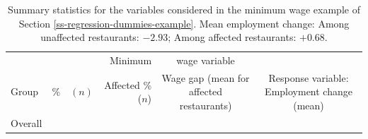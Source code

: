\documentclass[11pt,a4paper,openany]{book}
\begin{document}
\begin{longtable}[]{@{}lrrrcc@{}}
\caption{\label{tab:t-fastfood-descr} Summary statistics for the variables
considered in the minimum wage example of Section
\ref{ss-regression-dummies-example}. Mean employment change: Among
unaffected restaurants: \(-2.93\); Among affected restaurants:
\(+0.68\).}\tabularnewline
\toprule
\begin{minipage}[t]{0.26\columnwidth}\raggedright\strut
\strut
\end{minipage} & \begin{minipage}[t]{0.04\columnwidth}\raggedleft\strut
\strut
\end{minipage} & \begin{minipage}[t]{0.05\columnwidth}\raggedleft\strut
\strut
\end{minipage} & \begin{minipage}[t]{0.29\columnwidth}\raggedleft\strut
Minimum\strut
\end{minipage} & \begin{minipage}[t]{0.10\columnwidth}\centering\strut
wage variable\strut
\end{minipage} & \begin{minipage}[t]{0.08\columnwidth}\centering\strut
\strut
\end{minipage}\tabularnewline
\begin{minipage}[t]{0.26\columnwidth}\raggedright\strut
Group\strut
\end{minipage} & \begin{minipage}[t]{0.04\columnwidth}\raggedleft\strut
\%\strut
\end{minipage} & \begin{minipage}[t]{0.05\columnwidth}\raggedleft\strut
\((n)\)\strut
\end{minipage} & \begin{minipage}[t]{0.29\columnwidth}\raggedleft\strut
Affected \% (\(n\))\strut
\end{minipage} & \begin{minipage}[t]{0.10\columnwidth}\centering\strut
Wage gap (mean for affected restaurants)\strut
\end{minipage} & \begin{minipage}[t]{0.08\columnwidth}\centering\strut
Response variable: Employment change (mean)\strut
\end{minipage}\tabularnewline
\begin{minipage}[t]{0.26\columnwidth}\raggedright\strut
Overall\strut
\end{minipage} & \begin{minipage}[t]{0.04\columnwidth}\raggedleft\strut

\end{minipage}
\end{longtable}
\end{document}

